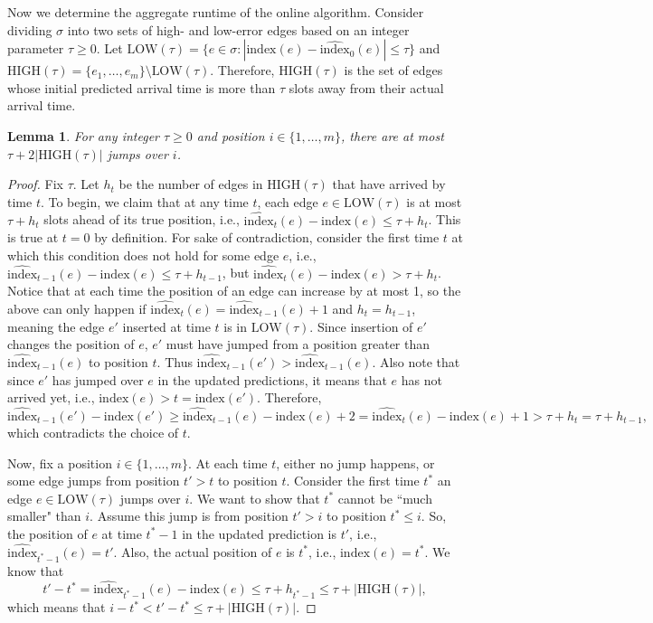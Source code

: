 \documentclass[11pt]{article}
\newtheorem{lemma}{Lemma}
\newcommand{\ind}{\text{index}}
\begin{document}
Now we determine the aggregate runtime of the online algorithm. Consider dividing $\sigma$ into two sets of high- and low-error edges based on an integer parameter $\tau \geq 0$.  Let $\text{LOW}(\tau) = \{e \in \sigma : |\ind(e) - \widehat{\ind}_0(e)| \leq \tau\}$ and $\text{HIGH}(\tau) =  \{e_1, \ldots, e_m\} \setminus \text{LOW}(\tau)$. 
Therefore, $\text{HIGH}(\tau)$ is the set of edges whose initial predicted arrival time is more than $\tau$ slots away from their actual arrival time.

\begin{lemma}
\label{lem:jump}
    For any integer $\tau\geq 0$ and  position $i \in \{1,\ldots,m\}$, there are at most $\tau + 2|\text{HIGH}(\tau)|$ jumps over $i$.
\end{lemma}

\begin{proof}
    Fix $\tau$. 
    Let $h_t$ be the number of edges in $\text{HIGH}(\tau)$ that have arrived by time $t$. 
    To begin, we claim that at any time $t$, each edge $e \in \text{LOW}(\tau)$ is at most $\tau + h_t$ slots ahead of its true position, i.e., $\widehat{\ind}_{t}(e) - \ind(e) \leq \tau + h_t$.
    This is true at $t = 0$ by definition. 
    For sake of contradiction, consider the first time $t$ at which this condition does not hold for some edge $e$, i.e., $\widehat{\ind}_{t-1}(e) - \ind(e) \leq \tau + h_{t-1}$, but $\widehat{\ind}_{t}(e) - \ind(e) > \tau + h_t$. 
    Notice that at each time the position of an edge can increase by at most 1, so the above can only happen if $\widehat{\ind}_{t}(e) = \widehat{\ind}_{t-1}(e) + 1$ and $h_t = h_{t-1}$, meaning the edge $e'$ inserted at time $t$ is in $\text{LOW}(\tau)$. Since insertion of $e'$ changes the position of $e$, $e'$ must have jumped from a position greater than $\widehat{\ind}_{t-1}(e)$ to position $t$. 
    Thus $\widehat{\ind}_{t-1}(e')>\widehat{\ind}_{t-1}(e)$. 
    Also note that since $e'$ has jumped over $e$ in the updated predictions, it means that $e$ has not arrived yet, i.e., $\ind(e)>t=\ind(e')$.
    Therefore, 
    \[
    \widehat{\ind}_{t-1}(e') - \ind(e') \geq \widehat{\ind}_{t-1}(e) - \ind(e) +2 = \widehat{\ind}_{t}(e) - \ind(e)+1 > \tau + h_t = \tau + h_{t-1},\]
    which contradicts the choice of $t$. 
    
    Now, fix a position $i\in \{1,\ldots,m\}$. 
    At each time $t$, either no jump happens, or some edge jumps from position $t' > t$ to position $t$.
    Consider the first time $t^*$ an edge $e \in \text{LOW}(\tau)$ jumps over $i$.
    We want to show that $t^*$ cannot be ``much smaller" than $i$.
    Assume this jump is from position $t' > i$ to position $t^* \leq i$.
    So, the position of $e$ at time $t^*-1$ in the updated prediction is $t'$, i.e., $\widehat{\ind}_{t^*-1}(e)=t'$.
    Also, the actual position of $e$ is $t^*$, i.e., $\ind(e)=t^*$.
    We know that 
    \[t'-t^*=\widehat{\ind}_{t^*-1}(e)-\ind(e) \leq \tau + h_{t^*-1}\leq \tau+|\text{HIGH}(\tau)|,\]
    which means that $i-t^*<t'-t^*\leq \tau+|\text{HIGH}(\tau)|$.
    

\end{proof}
\end{document}
